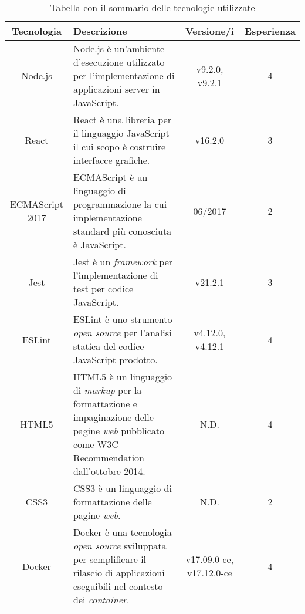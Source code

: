 \begin{table}[H]
\caption{Tabella con il sommario delle tecnologie utilizzate}
\label{tab:tecnologie}
\begin{tabularx}{\linewidth}{|c|X|c|c|}
\hline
\textbf{Tecnologia} & \textbf{Descrizione} & \textbf{Versione/i} & \textbf{Esperienza}\\
\hline
Node.js & Node.js è un'ambiente d'esecuzione utilizzato per l'implementazione di applicazioni server in JavaScript. & v9.2.0, v9.2.1 & 4 \\
\hline
React & React è una libreria per il linguaggio JavaScript il cui scopo è costruire interfacce grafiche. & v16.2.0 & 3 \\
\hline
ECMAScript 2017 & ECMAScript è un linguaggio di programmazione la cui implementazione standard più conosciuta è JavaScript. & 06/2017 & 2 \\
\hline
Jest & Jest è un \emph{framework} per l'implementazione di test per codice JavaScript. & v21.2.1 & 3 \\
\hline
ESLint & ESLint è uno strumento \emph{open source} per l'analisi statica del codice JavaScript prodotto. & v4.12.0, v4.12.1 & 4 \\
\hline
HTML5 & HTML5 è un linguaggio di \emph{markup} per la formattazione e impaginazione delle pagine \emph{web} pubblicato come W3C Recommendation dall'ottobre 2014. & N.D. & 4 \\
\hline
CSS3 & CSS3 è un linguaggio di formattazione delle pagine \emph{web}. & N.D. & 2 \\
\hline
Docker & Docker è una tecnologia \emph{open source} sviluppata per semplificare il rilascio di applicazioni eseguibili nel contesto dei \emph{container}. & v17.09.0-ce, v17.12.0-ce & 4 \\
\hline
\end{tabularx}
\end{table}

